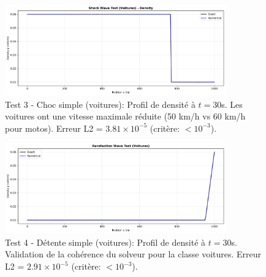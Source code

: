 \begin{figure}[h!]
\centering
\includegraphics[width=0.85\textwidth]{SPRINT2_DELIVERABLES/figures/test3_shock_voitures.png}
\caption{Test 3 - Choc simple (voitures): Profil de densité à $t=30$s. 
Les voitures ont une vitesse maximale réduite (50 km/h vs 60 km/h pour motos). 
Erreur L2 = $3.81 \times 10^{-5}$ (critère: $< 10^{-3}$).}
\label{fig:riemann_choc_voitures}
\end{figure}

\begin{figure}[h!]
\centering
\includegraphics[width=0.85\textwidth]{SPRINT2_DELIVERABLES/figures/test4_rarefaction_voitures.png}
\caption{Test 4 - Détente simple (voitures): Profil de densité à $t=30$s. 
Validation de la cohérence du solveur pour la classe voitures. 
Erreur L2 = $2.91 \times 10^{-5}$ (critère: $< 10^{-3}$).}
\label{fig:riemann_rarefaction_voitures}
\end{figure}

